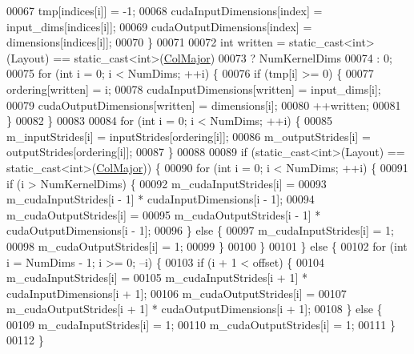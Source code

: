 \begin{DoxyCode}
00067       tmp[indices[i]] = -1;
00068       cudaInputDimensions[index] = input\_dims[indices[i]];
00069       cudaOutputDimensions[index] = dimensions[indices[i]];
00070     \}
00071 
00072     \textcolor{keywordtype}{int} written = \textcolor{keyword}{static\_cast<}\textcolor{keywordtype}{int}\textcolor{keyword}{>}(Layout) == static\_cast<int>(\hyperlink{group__enums_ggaacded1a18ae58b0f554751f6cdf9eb13a0cbd4bdd0abcfc0224c5fcb5e4f6669a}{ColMajor})
00073                       ? NumKernelDims
00074                       : 0;
00075     \textcolor{keywordflow}{for} (\textcolor{keywordtype}{int} i = 0; i < NumDims; ++i) \{
00076       \textcolor{keywordflow}{if} (tmp[i] >= 0) \{
00077         ordering[written] = i;
00078         cudaInputDimensions[written] = input\_dims[i];
00079         cudaOutputDimensions[written] = dimensions[i];
00080         ++written;
00081       \}
00082     \}
00083 
00084     \textcolor{keywordflow}{for} (\textcolor{keywordtype}{int} i = 0; i < NumDims; ++i) \{
00085       m\_inputStrides[i] = inputStrides[ordering[i]];
00086       m\_outputStrides[i] = outputStrides[ordering[i]];
00087     \}
00088 
00089     \textcolor{keywordflow}{if} (static\_cast<int>(Layout) == \textcolor{keyword}{static\_cast<}\textcolor{keywordtype}{int}\textcolor{keyword}{>}(\hyperlink{group__enums_ggaacded1a18ae58b0f554751f6cdf9eb13a0cbd4bdd0abcfc0224c5fcb5e4f6669a}{ColMajor})) \{
00090       \textcolor{keywordflow}{for} (\textcolor{keywordtype}{int} i = 0; i < NumDims; ++i) \{
00091         \textcolor{keywordflow}{if} (i > NumKernelDims) \{
00092           m\_cudaInputStrides[i] =
00093               m\_cudaInputStrides[i - 1] * cudaInputDimensions[i - 1];
00094           m\_cudaOutputStrides[i] =
00095               m\_cudaOutputStrides[i - 1] * cudaOutputDimensions[i - 1];
00096         \} \textcolor{keywordflow}{else} \{
00097           m\_cudaInputStrides[i] = 1;
00098           m\_cudaOutputStrides[i] = 1;
00099         \}
00100       \}
00101     \} \textcolor{keywordflow}{else} \{
00102       \textcolor{keywordflow}{for} (\textcolor{keywordtype}{int} i = NumDims - 1; i >= 0; --i) \{
00103         \textcolor{keywordflow}{if} (i + 1 < offset) \{
00104           m\_cudaInputStrides[i] =
00105               m\_cudaInputStrides[i + 1] * cudaInputDimensions[i + 1];
00106           m\_cudaOutputStrides[i] =
00107               m\_cudaOutputStrides[i + 1] * cudaOutputDimensions[i + 1];
00108         \} \textcolor{keywordflow}{else} \{
00109           m\_cudaInputStrides[i] = 1;
00110           m\_cudaOutputStrides[i] = 1;
00111         \}
00112       \}

\end{DoxyCode}
